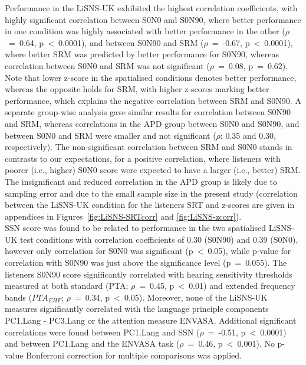 \documentclass[a4paper, twoside]{templates/ociamthesis}
\begin{document}
Performance in the LiSNS-UK exhibited the highest correlation coefficients, with highly significant correlation between S0N0 and S0N90, where better performance in one condition was highly associated with better performance in the other (\(\rho\)~=~0.64, p~\textless~0.0001), and between S0N90 and SRM (\(\rho\)~=~-0.67, p~\textless~0.0001), where better SRM was predicted by better performance for S0N90, whereas correlation between S0N0 and SRM was not significant (\(\rho\)~=~0.08, p~=~0.62). Note that lower z-score in the spatialised conditions denotes better performance, whereas the opposite holds for SRM, with higher z-scores marking better performance, which explains the negative correlation between SRM and S0N90. A separate group-wise analysis gave similar results for correlation between S0N90 and SRM, whereas correlations in the APD group between S0N0 and S0N90, and between S0N0 and SRM were smaller and not significant (\(\rho\): 0.35 and 0.30, respectively). The non-significant correlation between SRM and S0N0 stands in contrasts to our expectations, for a positive correlation, where listeners with poorer (i.e., higher) S0N0 score were expected to have a larger (i.e., better) SRM. The insignificant and reduced correlation in the APD group is likely due to sampling error and due to the small sample size in the present study (correlation between the LiSNS-UK condition for the listeners SRT and z-scores are given in appendices in Figures~\ref{fig:LiSNS-SRTcorr} and \ref{fig:LiSNS-zcorr}).\\

SSN score was found to be related to performance in the two spatialised LiSNS-UK test conditions with correlation coefficients of 0.30 (S0N90) and 0.39 (S0N0), however only correlation for S0N0 was significant (p~\textless~0.05), while p-value for correlation with S0N90 was just above the significance level (p~=~0.055). The listeners S0N90 score significantly correlated with hearing sensitivity thresholds measured at both standard (PTA; \(\rho\)~=~0.45, p~\textless~0.01) and extended frequency bands (\(PTA_{EHF}\); \(\rho\)~=~0.34, p~\textless~0.05). Moreover, none of the LiSNS-UK measures significantly correlated with the language principle components PC1.Lang - PC3.Lang or the attention measure ENVASA. Additional significant correlations were found between PC1.Lang and SSN (\(\rho\)~=~-0.51, p~\textless~0.0001) and between PC1.Lang and the ENVASA task (\(\rho\)~=~0.46, p~\textless~0.001). No p-value Bonferroni correction for multiple comparisons was applied.
\end{document}
